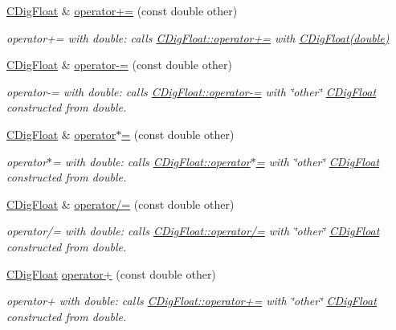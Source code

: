 \begin{DoxyCompactItemize}
\hyperlink{classCDigFloat}{C\+Dig\+Float} \& \hyperlink{classCDigFloat_a9fdc59da135bf2a165f28fa95258beb9}{operator+=} (const double other)
\begin{DoxyCompactList}\small\item\em operator+= with double\+: calls \hyperlink{classCDigFloat_a84b2ad9b4d1a75aae261074ed7c6fefe}{C\+Dig\+Float\+::operator+=} with \hyperlink{classCDigFloat_a0ae24452dfb7838ec97a3998cd2b8f36}{C\+Dig\+Float(double)} \end{DoxyCompactList}\item 
\hyperlink{classCDigFloat}{C\+Dig\+Float} \& \hyperlink{classCDigFloat_a783166f772c1d638b03eb62de27d775d}{operator-\/=} (const double other)
\begin{DoxyCompactList}\small\item\em operator-\/= with double\+: calls \hyperlink{classCDigFloat_a7496a4f8445815e9a346076c3d90305a}{C\+Dig\+Float\+::operator-\/=} with \char`\"{}other\char`\"{} \hyperlink{classCDigFloat}{C\+Dig\+Float} constructed from double. \end{DoxyCompactList}\item 
\hyperlink{classCDigFloat}{C\+Dig\+Float} \& \hyperlink{classCDigFloat_a9a01529fa684f7f5eb915b2d308578ea}{operator$\ast$=} (const double other)
\begin{DoxyCompactList}\small\item\em operator$\ast$= with double\+: calls \hyperlink{classCDigFloat_a9535d47a31a3f1cfa487cc8c567a4a12}{C\+Dig\+Float\+::operator$\ast$=} with \char`\"{}other\char`\"{} \hyperlink{classCDigFloat}{C\+Dig\+Float} constructed from double. \end{DoxyCompactList}\item 
\hyperlink{classCDigFloat}{C\+Dig\+Float} \& \hyperlink{classCDigFloat_ab6531a2016f5cc631cc92719ffc06385}{operator/=} (const double other)
\begin{DoxyCompactList}\small\item\em operator/= with double\+: calls \hyperlink{classCDigFloat_a53d3939dfc89d172f1bf803a46bc3369}{C\+Dig\+Float\+::operator/=} with \char`\"{}other\char`\"{} \hyperlink{classCDigFloat}{C\+Dig\+Float} constructed from double. \end{DoxyCompactList}\item 
\hyperlink{classCDigFloat}{C\+Dig\+Float} \hyperlink{classCDigFloat_a7fd363bbeb039e11fcc2d1b0ca628173}{operator+} (const double other)
\begin{DoxyCompactList}\small\item\em operator+ with double\+: calls \hyperlink{classCDigFloat_a84b2ad9b4d1a75aae261074ed7c6fefe}{C\+Dig\+Float\+::operator+=} with \char`\"{}other\char`\"{} \hyperlink{classCDigFloat}{C\+Dig\+Float} constructed from double. \end{DoxyCompactList}\item 

\end{DoxyCompactItemize}
